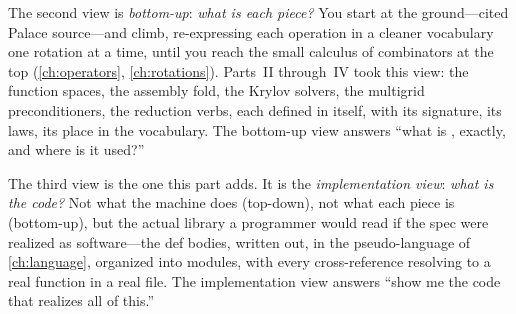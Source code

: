 The second view is \emph{bottom-up}: \emph{what is each piece?} You start at the
ground---cited Palace source---and climb, re-expressing each operation in a
cleaner vocabulary one rotation at a time, until you reach the small calculus of
combinators at the top (\cref{ch:operators}, \cref{ch:rotations}). Parts~II
through~IV took this view: the function spaces, the assembly fold, the Krylov
solvers, the multigrid preconditioners, the reduction verbs, each defined in
itself, with its signature, its laws, its place in the vocabulary. The bottom-up
view answers ``what is , exactly, and where is it used?''

The third view is the one this part adds. It is the \emph{implementation view}:
\emph{what is the code?} Not what the machine does (top-down), not what each piece
is (bottom-up), but the actual library a programmer would read if the spec were
realized as software---the def bodies, written out, in the pseudo-language of
\cref{ch:language}, organized into modules, with every cross-reference resolving to
a real function in a real file. The implementation view answers ``show me the code
that realizes all of this.''

